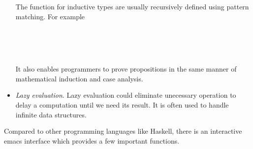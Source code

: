 \begin{itemize}
\begin{code}\>\<%
\>  \AgdaSymbol{:}  \<%
\\
\>[0]\<[2]%
\>[2] \AgdaSymbol{:} \<%
\\
\>[0]\<[2]%
\>[2] \<[7]%
\>[7]\AgdaSymbol{:} \AgdaSymbol{(} \AgdaSymbol{:} \AgdaSymbol{)}  \<%
\>\<\end{code}

The function for inductive types are usually recursively defined using pattern matching. For example
\begin{code}\>\<%
\\
\> \AgdaSymbol{:}   \<%
\\
\>  \AgdaSymbol{=} \<%
\\
\> \AgdaSymbol{(} \AgdaSymbol{)} \AgdaSymbol{=}  \AgdaSymbol{(} \AgdaSymbol{(} \AgdaSymbol{))}\<%
\>\<\end{code}

It also enables programmers to prove propositions in the same manner of mathematical induction and case analysis.

\item \textit{Lazy evaluation}. Lazy evaluation could eliminate unecessary operation to delay a computation until we need its result. It is often used to handle infinite data structures. \cite{wiki:Lazy_evaluation}

\end{itemize}

Compared to other programming languages like Haskell, there is an interactive emacs interface which provides a few important functions.

